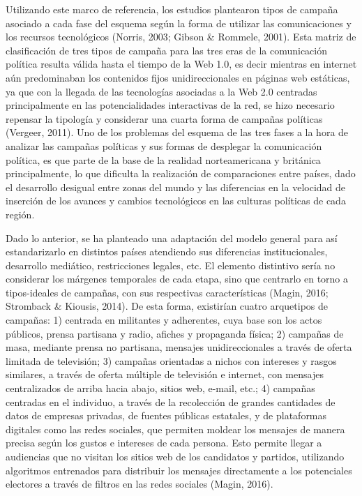 \documentclass[
  10pt,
  letterpaper,
]{report}
\begin{document}
Utilizando este marco de referencia, los estudios plantearon tipos de
campaña asociado a cada fase del esquema según la forma de utilizar las
comunicaciones y los recursos tecnológicos (Norris, 2003; Gibson \&
Rommele, 2001). Esta matriz de clasificación de tres tipos de campaña
para las tres eras de la comunicación política resulta válida hasta el
tiempo de la Web 1.0, es decir mientras en internet aún predominaban los
contenidos fijos unidireccionales en páginas web estáticas, ya que con
la llegada de las tecnologías asociadas a la Web 2.0 centradas
principalmente en las potencialidades interactivas de la red, se hizo
necesario repensar la tipología y considerar una cuarta forma de
campañas políticas (Vergeer, 2011). Uno de los problemas del esquema de
las tres fases a la hora de analizar las campañas políticas y sus formas
de desplegar la comunicación política, es que parte de la base de la
realidad norteamericana y británica principalmente, lo que dificulta la
realización de comparaciones entre países, dado el desarrollo desigual
entre zonas del mundo y las diferencias en la velocidad de inserción de
los avances y cambios tecnológicos en las culturas políticas de cada
región.

Dado lo anterior, se ha planteado una adaptación del modelo general para
así estandarizarlo en distintos países atendiendo sus diferencias
institucionales, desarrollo mediático, restricciones legales, etc. El
elemento distintivo sería no considerar los márgenes temporales de cada
etapa, sino que centrarlo en torno a tipos-ideales de campañas, con sus
respectivas características (Magin, 2016; Stromback \& Kiousis, 2014).
De esta forma, existirían cuatro arquetipos de campañas: 1) centrada en
militantes y adherentes, cuya base son los actos públicos, prensa
partisana y radio, afiches y propaganda física; 2) campañas de masa,
mediante prensa no partisana, mensajes unidireccionales a través de
oferta limitada de televisión; 3) campañas orientadas a nichos con
intereses y rasgos similares, a través de oferta múltiple de televisión
e internet, con mensajes centralizados de arriba hacia abajo, sitios
web, e-mail, etc.; 4) campañas centradas en el individuo, a través de la
recolección de grandes cantidades de datos de empresas privadas, de
fuentes públicas estatales, y de plataformas digitales como las redes
sociales, que permiten moldear los mensajes de manera precisa según los
gustos e intereses de cada persona. Esto permite llegar a audiencias que
no visitan los sitios web de los candidatos y partidos, utilizando
algoritmos entrenados para distribuir los mensajes directamente a los
potenciales electores a través de filtros en las redes sociales (Magin,
2016).
\end{document}
